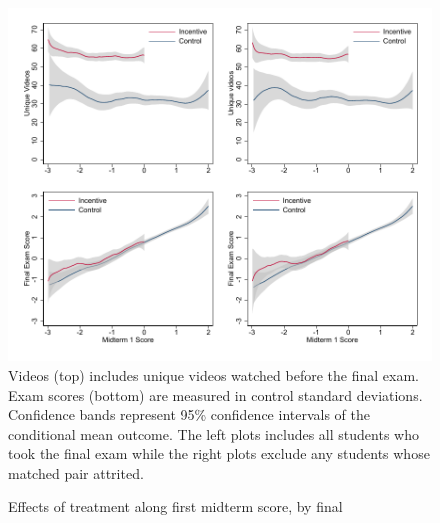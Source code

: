 \documentclass[12pt]{article}
\begin{document}
\clearpage
\begin{figure}[t]
\begin{center}
\caption{Effects of treatment along first midterm score, by final}
\label{locallin_final}
\includegraphics[width=1\textwidth, angle=0]{../plots/lpolyfinal.pdf}
\footnotesize Videos (top) includes unique videos watched before the final exam. Exam scores (bottom) are measured in control standard deviations. Confidence bands represent 95\% confidence intervals of the conditional mean outcome. The left plots includes all students who took the final exam while the right plots exclude any students whose matched pair attrited.
\end{center}
\end{figure}

\end{document}
